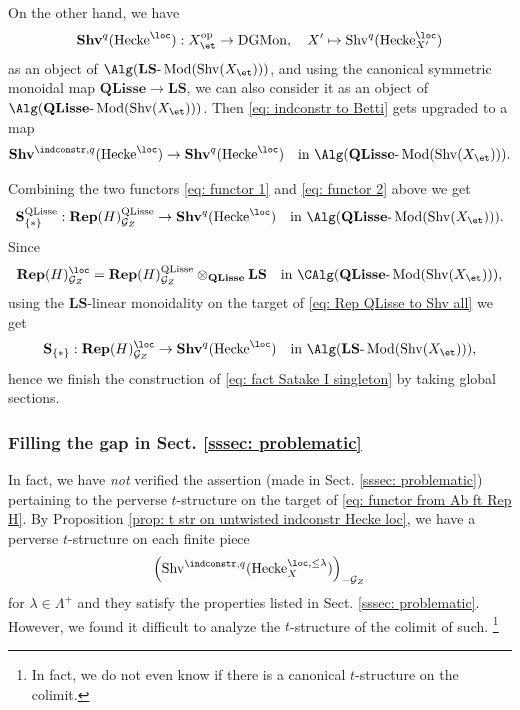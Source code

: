 \documentclass[10pt]{amsart}
\newcommand{\sssec}{\subsubsection}
\theoremstyle{remark}
\newcommand{\te}{\text}
\newcommand{\on}{\operatorname}
\newcommand{\cG}{\mathcal{G}}
\newcommand{\DGCatMon}{\on{DGMon}}
\newcommand{\lMod}{\text{-}\on{Mod}}
\newcommand{\Shv}{\on{Shv}}
\newcommand{\QLisse}{\on{QLisse}}
\DeclareMathOperator{\op}{op}
\newcommand{\Hecke}{\on{Hecke}}
\begin{document}
On the other hand, we have
\[\mathbf{Shv}^q(\Hecke^{\loc}): X^{\op}_{\et}\rightarrow \DGCatMon,\quad X'\mapsto \Shv^q(\Hecke^{\loc}_{X'})\]
as an object of $\Alg(\mathbf{LS}\lMod(\Shv(X_{\et})))$, and using the canonical symmetric monoidal map $\mathbf{QLisse}\rightarrow \mathbf{LS}$,
we can also consider it as an object of $\Alg(\mathbf{QLisse}\lMod(\Shv(X_{\et})))$. Then \eqref{eq: indconstr to Betti} gets upgraded to a map
\begin{equation}\label{eq: functor 2}
    \mathbf{Shv}^{\indconstr,q}(\Hecke^{\loc})\rightarrow \mathbf{Shv}^q(\Hecke^{\loc})\quad \te{in }\Alg(\mathbf{QLisse}\lMod(\Shv(X_{\et}))).
\end{equation}


Combining the two functors \eqref{eq: functor 1} and \eqref{eq: functor 2} above we get
\begin{equation}\label{eq: Rep QLisse to Shv all}
\mathbf{S}^{\QLisse}_{\{*\}}:\mathbf{Rep}(H)^{\QLisse}_{\cG_Z}\rightarrow \mathbf{Shv}^{q}(\Hecke^{\loc})\quad \te{in } \Alg(\mathbf{QLisse}\lMod(\Shv(X_{\et}))).
\end{equation}
 Since
\[\mathbf{Rep}(H)^{\loc}_{\cG_Z}=\mathbf{Rep}(H)^{\QLisse}_{\cG_Z}\otimes_{\mathbf{QLisse}}\mathbf{LS} \quad\te{in } \CAlg(\mathbf{QLisse}\lMod(\Shv(X_{\et}))),\]
 using the $\mathbf{LS}$-linear monoidality on the target of \eqref{eq: Rep QLisse to Shv all} we get
\begin{equation}\label{eq: fact Satake singleton sheafy}
\mathbf{S}_{\{*\}}:\mathbf{Rep}(H)^{\loc}_{\cG_Z}\rightarrow \mathbf{Shv}^{q}(\Hecke^{\loc})\quad\te{in } \Alg(\mathbf{LS}\lMod(\Shv(X_{\et}))),
\end{equation}
 hence we finish the construction of \eqref{eq: fact Satake I singleton} by taking global sections.

\sssec{Filling the gap in Sect. \ref{sssec: problematic}}\label{sssec: ind nature precise}
In fact, we have \emph{not} verified the assertion (made in Sect. \ref{sssec: problematic}) pertaining to the perverse $t$-structure on the target of \eqref{eq: functor from Ab ft Rep H}. By Proposition \ref{prop: t str on untwisted indconstr Hecke loc}, we have a perverse $t$-structure on each finite piece 
\[\left(\Shv^{\indconstr,q}(\Hecke^{\loc,\le\lambda}_X)\right)_{-\cG_Z}\]
for $\lambda\in\Lambda^+$ and they satisfy the properties listed in Sect. \ref{sssec: problematic}. However, we found it difficult to analyze the $t$-structure of the colimit of such. \footnote{In fact, we do not even know if there is a canonical $t$-structure on the colimit.}
\medskip
\end{document}
